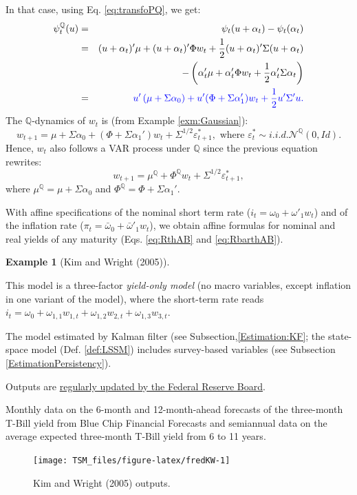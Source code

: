 \documentclass[
  12pt,
]{book}
\theoremstyle{definition}
\theoremstyle{definition}
\newtheorem{example}{Example}[chapter]
\theoremstyle{definition}
\theoremstyle{definition}
\theoremstyle{remark}
\begin{document}
In that case, using Eq. \eqref{eq:transfoPQ}, we get:
\begin{eqnarray*}
\psi_t^{\mathbb{Q}}(u) &=& \psi_t(u + \alpha_t) - \psi_t(\alpha_t)\\
&=& (u + \alpha_t)'\mu + (u + \alpha_t)'\Phi w_t + \frac{1}{2}(u + \alpha_t)'\Sigma(u + \alpha_t) \\
&& - \left(\alpha_t'\mu + \alpha_t'\Phi w_t + \frac{1}{2}\alpha_t'\Sigma\alpha_t\right) \\
&=& \color{blue}{u' \left(\mu + \Sigma \alpha_0 \right) + u'(\Phi + \Sigma \alpha_1')w_t  + \frac{1}{2}u'\Sigma'u}.
\end{eqnarray*}
The \(\mathbb{Q}\)-dynamics of \(w_t\) is (from Example \ref{exm:Gaussian}):
\[
w_{t+1} = \mu + \Sigma  \alpha_0 + (\Phi + \Sigma \alpha_1')  w_{t} + \Sigma^{1/2} \varepsilon^*_{t+1}, \mbox{ where } \varepsilon^*_{t} \sim  i.i.d. \mathcal{N}^{\mathbb{Q}}(0,Id).
\]
Hence, \(w_t\) also follows a VAR process under \(\mathbb{Q}\) since the previous equation rewrites:
\[
w_{t+1} = \mu^{\mathbb{Q}} + \Phi^{\mathbb{Q}} w_{t} + \Sigma^{1/2} \varepsilon^*_{t+1},
\]
where \(\mu^{\mathbb{Q}} = \mu + \Sigma \alpha_0\) and \(\Phi^{\mathbb{Q}}=\Phi + \Sigma \alpha_1'\).

With affine specifications of the nominal short term rate (\(i_{t} = \omega_0 + \omega'_1 w_t\)) and of the inflation rate (\(\pi_{t} = \bar\omega_0 + \bar\omega'_1 w_t\)), we obtain affine formulas for nominal and real yields of any maturity (Eqs. \eqref{eq:RthAB} and \eqref{eq:RbarthAB}).

\begin{example}[Kim and Wright (2005)]
\protect\hypertarget{exm:KimWright}{}\label{exm:KimWright}

This model is a three-factor \emph{yield-only model} (no macro variables, except inflation in one variant of the model), where the short-term rate reads \(i_t = \omega_0 + \omega_{1,1} w_{1,t} +\omega_{1,2} w_{2,t} +\omega_{1,3} w_{3,t}\).

The model estimated by Kalman filter (see Subsection,\ref{Estimation:KF}; the state-space model (Def. \ref{def:LSSM}) includes survey-based variables (see Subsection \ref{EstimationPersistency}).

Outputs are \href{https://www.federalreserve.gov/pubs/feds/2005/200533/200533abs.html}{regularly updated by the Federal Reserve Board}.

Monthly data on the 6-month and 12-month-ahead forecasts of the three-month T-Bill yield from Blue Chip Financial Forecasts and semiannual data on the average expected three-month T-Bill yield from 6 to 11 years.

\begin{figure}
\texttt{[image: TSM\_files/figure-latex/fredKW-1]} \caption{Kim and Wright (2005) outputs.}\label{fig:fredKW}
\end{figure}

\end{example}
\end{document}
